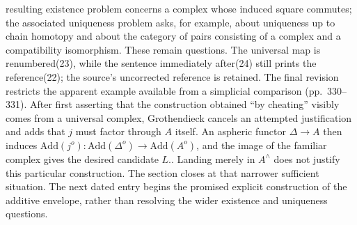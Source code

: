 \documentclass[10pt,oneside]{book}
\begin{document}
resulting existence problem concerns a complex whose induced square commutes; the associated uniqueness problem asks, for example, about uniqueness up to chain homotopy and about the category of pairs consisting of a complex and a compatibility isomorphism. These remain questions. The universal map is renumbered(23), while the sentence immediately after(24) still prints the reference(22); the source's uncorrected reference is retained. The final revision restricts the apparent example available from a simplicial comparison (pp.~330--331). After first asserting that the construction obtained ``by cheating'' visibly comes from a universal complex, Grothendieck cancels an attempted justification and adds that $j$ must factor through $A$ itself. An aspheric functor $\Delta\to A$ then induces $\mathrm{Add}(j^o):\mathrm{Add}(\Delta^o)\to\mathrm{Add}(A^o)$, and the image of the familiar complex gives the desired candidate $L.$. Landing merely in $A^{\wedge}$ does not justify this particular construction. The section closes at that narrower sufficient situation. The next dated entry begins the promised explicit construction of the additive envelope, rather than resolving the wider existence and uniqueness questions.
\end{document}
